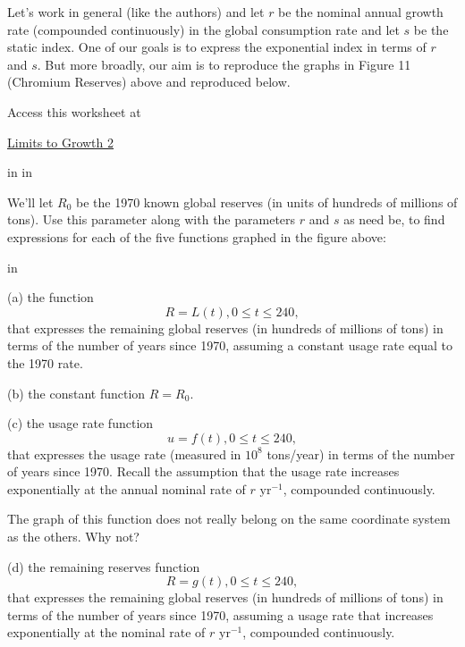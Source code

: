 \documentclass{ximera}
\newcommand{\pskip}{\vskip 0.1 in}
\begin{document}
\begin{question}   \label{Q34fratr5}
Let's work in general (like the authors) and let $r$ be the nominal annual growth rate (compounded continuously) in the global consumption rate and let $s$ be the static index. One of our goals is to express  the exponential index in terms of $r$ and $s$.  
But more broadly, our aim is to reproduce the graphs in Figure 11 (Chromium Reserves) above and reproduced below. 



 
\begin{onlineOnly}
    \begin{center}
\end{center}
\end{onlineOnly}

Access this worksheet at

\href{https://www.desmos.com/calculator/er2jq9vzeq}{Limits to Growth 2}

\pskip \pskip

We'll let $R_0$ be the 1970 known global reserves (in units of hundreds of millions of tons). Use this parameter along with the parameters $r$ and $s$ as need be, to find expressions for each of the five functions graphed in the figure above:

\pskip 

(a) the function 
\[
   R = L(t), 0\leq t \leq 240,
\]
that expresses the remaining global reserves (in hundreds of millions of tons) in terms of the number of years since 1970, assuming a constant usage rate equal to the 1970 rate.

(b) the constant function $R=R_0$.

(c) the usage rate function 
\[
     u = f(t) , 0\leq t \leq 240,
\]
that expresses the usage rate (measured in $10^8$ tons/year) in terms of the number of years since 1970. Recall the assumption that the usage rate increases exponentially at the annual nominal rate of $r \text{ yr}^{-1}$, compounded continuously.

The graph of this function does not really belong on the same coordinate system as the others. Why not?

(d) the remaining reserves function
\[
    R = g(t) , 0\leq t \leq 240,
\]
that expresses the remaining global reserves (in hundreds of millions of tons) in terms of the number of years since 1970, assuming a usage rate that increases exponentially at the nominal rate of $r \text{ yr}^{-1}$, compounded continuously.


\end{question}
\end{document}
